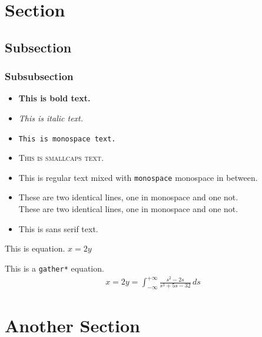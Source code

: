 \documentclass[english,palatino]{ist-report}
\author{Daniel de Schiffart}
\begin{document}
\makeheader

\section{Section}

\lipsum[1]

\subsection{Subsection}

\lipsum[1-2]

\subsubsection{Subsubsection}

\begin{itemize}
	\item \textbf{This is bold text.}
	\item \textit{This is italic text.}
	\item \texttt{This is monospace text.}
	\item \textsc{This is smallcaps text.}
	\item This is regular text mixed with \texttt{monospace} monospace in between.
	\item These are two identical lines, one in monospace and one not. \\ {\ttfamily These are two identical lines, one in monospace and one not.}
	\item \textsf{This is sans serif text.}
\end{itemize}

This is equation. $x = 2y$

This is a \texttt{gather*} equation.
\begin{gather*}
	x = 2y = \int_{-\infty}^{+\infty}\frac{s^2 - 2s}{s^3 + 5s - 32}\,ds
\end{gather*}

\section{Another Section}

\lipsum[1-3]
\end{document}
